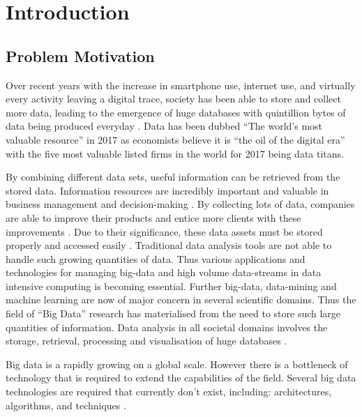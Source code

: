 %
%
%
%
\chapter{Introduction}\label{chap:introduction}
\vspace{-1cm}

\section{Problem Motivation}
Over recent years with the increase in smartphone use, internet use, and virtually every activity leaving a digital trace, society has been able to store and collect more data, leading to the emergence of huge databases with quintillion bytes of data being produced everyday \cite{economist:2017:twm}. Data has been dubbed ``The world's most valuable resource'' in 2017 as economists believe it is ``the oil of the digital era'' with the five most valuable listed firms in the world for 2017 being data titans\cite{economist:2017:twm}. 

By combining different data sets, useful information can be retrieved from the stored data. Information resources are incredibly important and valuable in business management and decision-making \cite{golfarelli:2009:dwd,wang:2014sar}. By collecting lots of data, companies are able to improve their products and entice more clients with these improvements \cite{economist:2017:twm}. Due to their significance, these data assets must be stored properly and accessed easily \cite{golfarelli:2009:dwd}. Traditional data analysis tools are not able to handle such growing quantities of data. Thus various applications and technologies for managing big-data and high volume data-streams in data intensive computing is becoming essential. Further big-data, data-mining and machine learning are now of major concern in several scientific domains. Thus the field of “Big Data” research has materialised from the need to store such large quantities of information. Data analysis in all societal domains involves the storage, retrieval, processing and visualisation of huge databases \cite{otoo:2006:esa}. 

Big data is a rapidly growing on a global scale. However there is a bottleneck of technology that is required to extend the capabilities of the field. Several big data technologies are required that currently don't exist, including: architectures, algorithms, and techniques \cite{twala:2017:bda,moukhi:2015:dws}.

